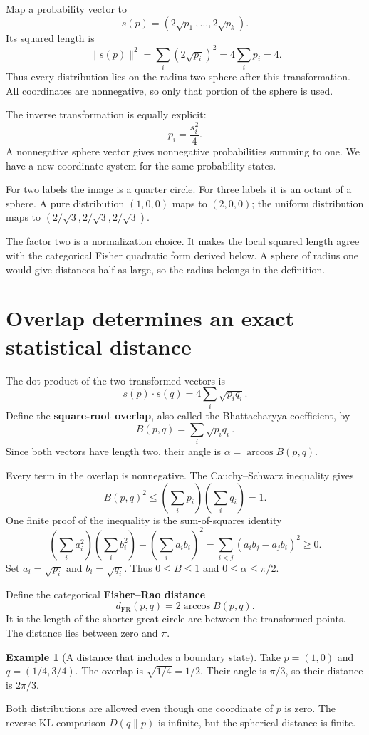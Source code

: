 \documentclass[11pt,oneside,openany]{book}
\theoremstyle{definition}
\newtheorem{example}{Example}[chapter]
\theoremstyle{remark}
\numberwithin{equation}{chapter}
\begin{document}
Map a probability vector to \[s(p)=(2\sqrt{p_1},\ldots,2\sqrt{p_k}).\] Its squared length is \[\|s(p)\|^2=\sum_i(2\sqrt{p_i})^2=4\sum_i p_i=4.\] Thus every distribution lies on the radius-two sphere after this transformation. All coordinates are nonnegative, so only that portion of the sphere is used.

The inverse transformation is equally explicit: \[p_i=\frac{s_i^2}{4}.\] A nonnegative sphere vector gives nonnegative probabilities summing to one. We have a new coordinate system for the same probability states.

For two labels the image is a quarter circle. For three labels it is an octant of a sphere. A pure distribution \((1,0,0)\) maps to \((2,0,0)\); the uniform distribution maps to \((2/\sqrt3,2/\sqrt3,2/\sqrt3)\).

The factor two is a normalization choice. It makes the local squared length agree with the categorical Fisher quadratic form derived below. A sphere of radius one would give distances half as large, so the radius belongs in the definition.

\section{Overlap determines an exact statistical distance}\label{ch07-overlap-determines-an-exact-statistical-distance}

The dot product of the two transformed vectors is \[s(p)\cdot s(q)=4\sum_i\sqrt{p_iq_i}.\] Define the \textbf{square-root overlap}, also called the Bhattacharyya coefficient, by \[B(p,q)=\sum_i\sqrt{p_iq_i}.\] Since both vectors have length two, their angle is \(\alpha=\arccos B(p,q)\).

Every term in the overlap is nonnegative. The Cauchy--Schwarz inequality gives \[B(p,q)^2\leq\left(\sum_i p_i\right)\left(\sum_i q_i\right)=1.\] One finite proof of the inequality is the sum-of-squares identity \[\left(\sum_i a_i^2\right)\left(\sum_i b_i^2\right)
-\left(\sum_i a_ib_i\right)^2
=\sum_{i<j}(a_ib_j-a_jb_i)^2\geq0.\] Set \(a_i=\sqrt{p_i}\) and \(b_i=\sqrt{q_i}\). Thus \(0\leq B\leq1\) and \(0\leq\alpha\leq\pi/2\).

Define the categorical \textbf{Fisher--Rao distance} \[\boxed{d_{\mathrm{FR}}(p,q)=2\arccos B(p,q).}\] It is the length of the shorter great-circle arc between the transformed points. The distance lies between zero and \(\pi\).

\begin{example}[A distance that includes a boundary state]

Take \(p=(1,0)\) and \(q=(1/4,3/4)\). The overlap is \(\sqrt{1/4}=1/2\). Their angle is \(\pi/3\), so their distance is \(2\pi/3\).

Both distributions are allowed even though one coordinate of \(p\) is zero. The reverse KL comparison \(D(q\|p)\) is infinite, but the spherical distance is finite.

\end{example}
\end{document}
